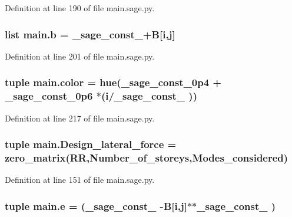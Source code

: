 Definition at line 190 of file main.\+sage.\+py.

\hypertarget{namespacemain_ab1e783015bffd2e1d395a9099143d967}{}
\subsubsection[{b}]{\setlength{\rightskip}{0pt plus 5cm}list main.\+b = \+\_\+sage\+\_\+const\+\_+{\bf B}\mbox{[}{\bf i},{\bf j}\mbox{]}}\label{namespacemain_ab1e783015bffd2e1d395a9099143d967}


Definition at line 201 of file main.\+sage.\+py.

\hypertarget{namespacemain_aeabbf69db1809807f065c2d1e9a62567}{}
\subsubsection[{color}]{\setlength{\rightskip}{0pt plus 5cm}tuple main.\+color = hue(\+\_\+sage\+\_\+const\+\_\+0p4 + \+\_\+sage\+\_\+const\+\_\+0p6 $\ast$({\bf i}/\+\_\+sage\+\_\+const\+\_ ))}\label{namespacemain_aeabbf69db1809807f065c2d1e9a62567}


Definition at line 217 of file main.\+sage.\+py.

\hypertarget{namespacemain_a0caf610899fee63b00acb7cce7c804d7}{}
\subsubsection[{Design\+\_\+lateral\+\_\+force}]{\setlength{\rightskip}{0pt plus 5cm}tuple main.\+Design\+\_\+lateral\+\_\+force = zero\+\_\+matrix(R\+R,Number\+\_\+of\+\_\+storeys,{\bf Modes\+\_\+considered})}\label{namespacemain_a0caf610899fee63b00acb7cce7c804d7}


Definition at line 151 of file main.\+sage.\+py.

\hypertarget{namespacemain_aa7f4fe671f919f7f067f9337ef9e02c0}{}
\subsubsection[{e}]{\setlength{\rightskip}{0pt plus 5cm}tuple main.\+e = (\+\_\+sage\+\_\+const\+\_ -\/{\bf B}\mbox{[}{\bf i},{\bf j}\mbox{]}$\ast$$\ast${\bf \+\_\+sage\+\_\+const\+\_} )}\label{namespacemain_aa7f4fe671f919f7f067f9337ef9e02c0}


